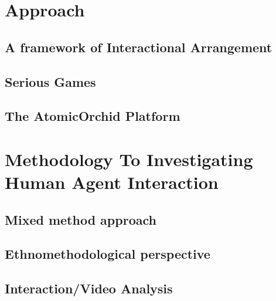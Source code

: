 \chapter{Approach}\label{ch:approach}

\section{A framework of Interactional Arrangement}

\section{Serious Games}

\section{The AtomicOrchid Platform}

\chapter{Methodology To Investigating Human Agent Interaction}

\section{ Mixed method approach }

\section{ Ethnomethodological perspective }

\section{Interaction/Video Analysis}




